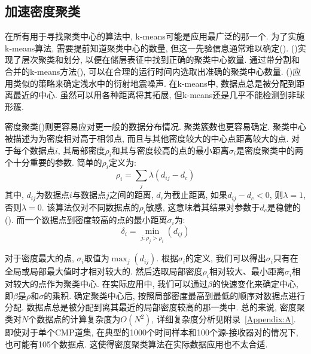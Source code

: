 \subsection{加速密度聚类}
在所有用于寻找聚类中心的算法中, k-means可能是应用最广泛的那一个. 为了实施k-means算法, 需要提前知道聚类中心的数量, 但这一先验信息通常难以确定(\cite{Hamerly2004}). (\cite{Wang2012})实现了层次聚类和划分, 以便在储层表征中找到正确的聚类中心数量. 通过带分割和合并的k-means方法(\cite{Muhr2009}), 可以在合理的运行时间内选取出准确的聚类中心数量. (\cite{Lu2014})应用类似的策略来确定浅水中的衍射地震噪声. 在k-means中, 数据点总是被分配到距离最近的中心. 虽然可以用各种距离将其拓展, 但k-means还是几乎不能检测到非球形簇. 

密度聚类(\cite{Rodriguez2014})则更容易应对更一般的数据分布情况. 聚类簇数也更容易确定. 聚类中心被描述为为密度相对高于相邻点, 而且与其他密度较大的中心点距离较大的点. 对于每个数据点$i$, 其局部密度$\rho_i$和其与密度较高的点的最小距离$\sigma_i$是密度聚类中的两个十分重要的参数. 简单的$\rho_i$定义为:
\begin{equation}
    \rho_{i}=\sum_{j} \lambda\left(d_{i j}-d_{c}\right)
\end{equation}
其中, $d_{ij}$为数据点$i$与数据点$j$之间的距离, $d_c$为截止距离, 如果$d_{ij}-d_c<0$, 则$λ = 1$, 否则$λ = 0$. 该算法仅对不同数据点的$\rho_i$敏感, 这意味着其结果对参数于$d_c$是稳健的(\cite{Rodriguez2014}). 而一个数据点到密度较高的点的最小距离$\sigma_i$为: 
\begin{equation}
    \delta_{i}=\min _{j: \rho_{j}>\rho_{i}}\left(d_{i j}\right)
\end{equation}

对于密度最大的点, $\sigma_i$取值为$\max_j(d_{ij})$. 根据$\sigma_i$的定义, 我们可以得出$\sigma_i$只有在全局或局部最大值时才相对较大的. 然后选取局部密度$\rho_i$相对较大、最小距离$\sigma_i$相对较大的点作为聚类中心. 在实际应用中, 我们可以通过$\beta$的快速变化来确定中心, 即$\beta$是$\rho$和$\sigma$的乘积. 确定聚类中心后, 按照局部密度最高到最低的顺序对数据点进行分配. 数据点总是被分配到离其最近的局部密度较高的那一类中. 总的来说, 密度聚类对$N$个数据点的计算复杂度为$O(N^2)$, 详细复杂度分析见附录~\ref{Appendix:A}. 即使对于单个CMP道集, 在典型的1000个时间样本和100个源-接收器对的情况下, 也可能有105个数据点. 这使得密度聚类算法在实际数据应用也不太合适. 

